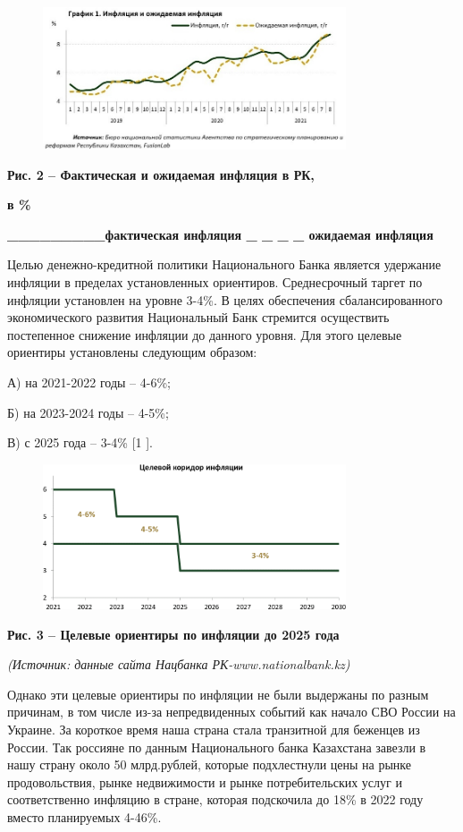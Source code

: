 \begin{figure}[H]
	\centering
	\includegraphics[width=0.8\textwidth]{assets/1118}
	\caption*{}
\end{figure}{\bfseries Рис.
2 -- Фактическая и ожидаемая инфляция в РК,}

{\bfseries в \%}

{\bfseries \_\_\_\_\_\_\_\_\_фактическая инфляция \_ \_ \_ \_ ожидаемая
инфляция}

Целью денежно-кредитной политики Национального Банка является удержание
инфляции в пределах установленных ориентиров. Среднесрочный таргет по
инфляции установлен на уровне 3-4\%. В целях обеспечения
сбалансированного экономического развития Национальный Банк стремится
осуществить постепенное снижение инфляции до данного уровня. Для этого
целевые ориентиры установлены следующим образом:

А) на 2021-2022 годы -- 4-6\%;

Б) на 2023-2024 годы -- 4-5\%;

В) с 2025 года -- 3-4\% {[}1 {]}.

\begin{figure}[H]
	\centering
	\includegraphics[width=0.8\textwidth]{assets/1119}
	\caption*{}
\end{figure}

{\bfseries Рис. 3 -- Целевые ориентиры по инфляции до 2025 года}

\emph{(Источник: данные сайта Нацбанка РК-www.nationalbank.kz)}

Однако эти целевые ориентиры по инфляции не были выдержаны по разным
причинам, в том числе из-за непредвиденных событий как начало СВО России
на Украине. За короткое время наша страна стала транзитной для беженцев
из России. Так россияне по данным Национального банка Казахстана завезли
в нашу страну около 50 млрд.рублей, которые подхлестнули цены на рынке
продовольствия, рынке недвижимости и рынке потребительских услуг и
соответственно инфляцию в стране, которая подскочила до 18\% в 2022 году
вместо планируемых 4-46\%.

